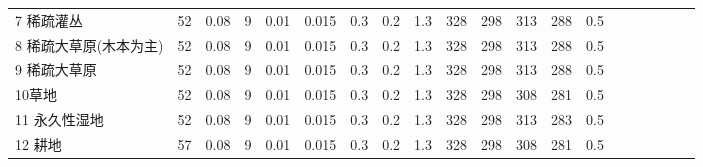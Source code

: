 \begin{landscape}
\begin{table}[htbp]
\begin{tabular}{@{}lccccccccccccccccccc@{}}
        7 稀疏灌丛        & 52          & 0.08          & 9          & 0.01          & 0.015          & 0.3          & 0.2          & 1.3          & 328          & 298          & 313          & 288          & 0.5          \\
        8 稀疏大草原(木本为主) & 52          & 0.08          & 9          & 0.01          & 0.015          & 0.3          & 0.2          & 1.3          & 328          & 298          & 313          & 288          & 0.5          \\
        9 稀疏大草原       & 52          & 0.08          & 9          & 0.01          & 0.015          & 0.3          & 0.2          & 1.3          & 328          & 298          & 313          & 288          & 0.5          \\
        10草地          & 52          & 0.08          & 9          & 0.01          & 0.015          & 0.3          & 0.2          & 1.3          & 328          & 298          & 308          & 281          & 0.5          \\
        11 永久性湿地      & 52          & 0.08          & 9          & 0.01          & 0.015          & 0.3          & 0.2          & 1.3          & 328          & 298          & 313          & 283          & 0.5          \\
        12 耕地         & 57          & 0.08          & 9          & 0.01          & 0.015          & 0.3          & 0.2          & 1.3          & 328          & 298          & 308          & 281          & 0.5        \\ %
%    

\end{tabular}
\end{table}
\end{landscape}
